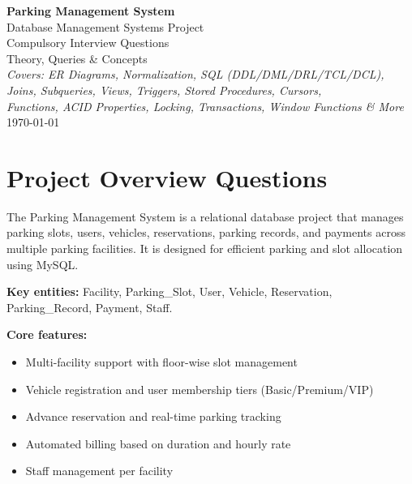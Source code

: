 \documentclass[12pt,a4paper]{article}
\begin{document}
\begin{titlepage}
\centering
\vspace*{3cm}
{\Huge\bfseries Parking Management System\\[0.5cm]}
{\LARGE Database Management Systems Project\\[1cm]}
{\Large Compulsory Interview Questions\\[0.3cm]}
{\large Theory, Queries \& Concepts\\[2cm]}
{\large\textit{Covers: ER Diagrams, Normalization, SQL (DDL/DML/DRL/TCL/DCL),\\
Joins, Subqueries, Views, Triggers, Stored Procedures, Cursors,\\
Functions, ACID Properties, Locking, Transactions, Window Functions \& More}}
\vfill
{\large \today}
\end{titlepage}

\tableofcontents
\newpage

\section{Project Overview Questions}

\begin{questionbox}
\end{questionbox}
\begin{answerbox}
The Parking Management System is a relational database project that manages parking slots, users, vehicles, reservations, parking records, and payments across multiple parking facilities. It is designed for efficient parking and slot allocation using MySQL.

\textbf{Key entities:} Facility, Parking\_Slot, User, Vehicle, Reservation, Parking\_Record, Payment, Staff.

\textbf{Core features:}
\begin{itemize}[nosep]
    \item Multi-facility support with floor-wise slot management
    \item Vehicle registration and user membership tiers (Basic/Premium/VIP)
    \item Advance reservation and real-time parking tracking
    \item Automated billing based on duration and hourly rate
    \item Staff management per facility
\end{itemize}
\end{answerbox}
\end{document}
